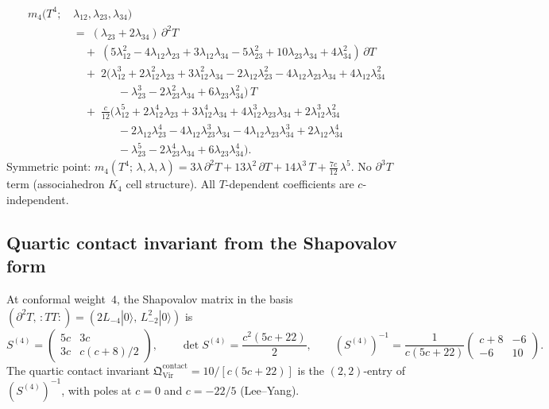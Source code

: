 \documentclass[11pt]{article}
\newcommand{\normord}[1]{:\!#1\!:}
\begin{document}
\begin{equation}\label{eq:m4-rectified}
\begin{aligned}
m_4(T^4;\,&\lambda_{12},\lambda_{23},\lambda_{34})
\\[2pt]
&=\;
(\lambda_{23} + 2\lambda_{34})\,\partial^2 T
\\[2pt]
&\quad +\;
(5\lambda_{12}^2 - 4\lambda_{12}\lambda_{23}
  + 3\lambda_{12}\lambda_{34}
  - 5\lambda_{23}^2 + 10\lambda_{23}\lambda_{34}
  + 4\lambda_{34}^2)\,\partial T
\\[2pt]
&\quad +\;
2(\lambda_{12}^3 + 2\lambda_{12}^2\lambda_{23}
  + 3\lambda_{12}^2\lambda_{34}
  - 2\lambda_{12}\lambda_{23}^2
  - 4\lambda_{12}\lambda_{23}\lambda_{34}
  + 4\lambda_{12}\lambda_{34}^2
\\
&\qquad\qquad
  - \lambda_{23}^3 - 2\lambda_{23}^2\lambda_{34}
  + 6\lambda_{23}\lambda_{34}^2)\,T
\\[2pt]
&\quad +\;
\tfrac{c}{12}
(\lambda_{12}^5 + 2\lambda_{12}^4\lambda_{23}
  + 3\lambda_{12}^4\lambda_{34}
  + 4\lambda_{12}^3\lambda_{23}\lambda_{34}
  + 2\lambda_{12}^3\lambda_{34}^2
\\
&\qquad\qquad
  - 2\lambda_{12}\lambda_{23}^4
  - 4\lambda_{12}\lambda_{23}^3\lambda_{34}
  - 4\lambda_{12}\lambda_{23}\lambda_{34}^3
  + 2\lambda_{12}\lambda_{34}^4
\\
&\qquad\qquad
  - \lambda_{23}^5 - 2\lambda_{23}^4\lambda_{34}
  + 6\lambda_{23}\lambda_{34}^4).
\end{aligned}
\end{equation}
Symmetric point:
$m_4(T^4;\,\lambda,\lambda,\lambda)
= 3\lambda\,\partial^2 T
+ 13\lambda^2\,\partial T
+ 14\lambda^3\, T
+ \tfrac{7c}{12}\,\lambda^5$.
No $\partial^3 T$ term (associahedron $K_4$ cell structure).
All $T$-dependent coefficients are $c$-independent.

\subsection{Quartic contact invariant from the Shapovalov form}

At conformal weight~$4$, the Shapovalov matrix in the basis
$(\partial^2 T,\, \normord{TT}) = (2L_{-4}|0\rangle,\,
L_{-2}^2|0\rangle)$ is
\[
S^{(4)}
=
\begin{pmatrix}
5c & 3c \\
3c & c(c+8)/2
\end{pmatrix},
\qquad
\det S^{(4)} = \frac{c^2(5c+22)}{2},
\qquad
(S^{(4)})^{-1}
=
\frac{1}{c(5c+22)}
\begin{pmatrix}
c+8 & -6 \\
-6 & 10
\end{pmatrix}.
\]
The quartic contact invariant
$\mathfrak{Q}^{\mathrm{contact}}_{\mathrm{Vir}}
= 10/[c(5c+22)]$
is the $(2,2)$-entry of $(S^{(4)})^{-1}$, with poles at
$c = 0$ and $c = -22/5$ (Lee--Yang).
\end{document}

